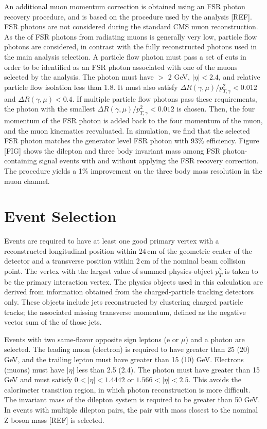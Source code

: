 An additional muon momentum correction is obtained using an FSR photon recovery procedure, and is based on the procedure used by the \hzz 
analysis [REF]. FSR photons are not considered during the standard CMS muon reconstruction. As the \pT of FSR photons from radiating 
muons is generally very low, particle flow photons are considered, in contrast with the fully reconstructed photons used in the main 
analysis selection. A particle flow photon must pass a set of cuts in order to be identified as an FSR photon associated with one of the 
muons selected by the analysis. The photon must have \pT $>$ 2 GeV, $|\eta|<2.4$, and relative particle flow isolation less than 1.8. 
It must also satisfy $\Delta R(\gamma, \mu)/p_{T,\gamma}^{2} < 0.012$ and $\Delta R(\gamma, \mu) < 0.4$. If multiple particle flow 
photons pass these requirements, the photon with the smallest $\Delta R(\gamma, \mu)/p_{T,\gamma}^{2} < 0.012$ is chosen. 
Then, the four momentum of the FSR photon is added back to the four momentum of the muon, and the muon kinematics reevaluated. 
In simulation, we find that the selected FSR photon matches the generator level FSR photon with 93\% efficiency. 
Figure [FIG] shows the dilepton and three body 
invariant mass among FSR photon-containing signal events with and without applying the FSR recovery correction.
The procedure yields a 1\% improvement on the three body mass resolution in the muon channel.

\section{Event Selection}
Events are required to have at least one good primary vertex
with a reconstructed longitudinal position within 24\,{cm} of the
geometric center of the detector and a transverse position within
2\,{cm} of the nominal beam collision point. The vertex with the largest value of summed physics-object
$p_{T}^2$ is taken to be the primary interaction vertex. The physics objects used in this calculation are derived from 
information obtained from the charged-particle tracking detectors only. These objects include jets reconstructed by 
clustering charged particle tracks; the associated missing transverse momentum, defined as the negative vector sum of the \pT of 
those jets.

Events with two same-flavor opposite sign leptons (e or $\mu$) and a photon are selected. The leading muon (electron) is required to have 
\pT greater than 25 (20) GeV, and the trailing lepton must have \pT greater than 15 (10) GeV. Electrons (muons) must have $|\eta|$ 
less than 2.5 (2.4). The photon must have \pT greater than 15 GeV and must satisfy $0 < |\eta| < 1.4442$ or $1.566 < |\eta| < 2.5$. 
This avoids the calorimeter transition region, in which photon reconstruction is more difficult. The invariant mass of the dilepton 
system is required to be greater than 50 GeV. In events with multiple dilepton pairs, the pair with mass closest to the nominal 
Z boson mass [REF] is selected. 

